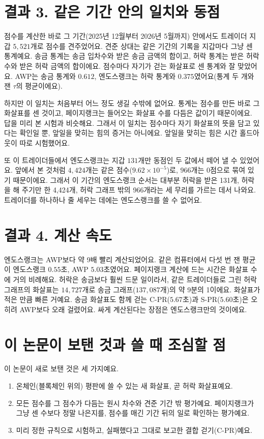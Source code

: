 \section*{결과 3. 같은 기간 안의 일치와 동점}

점수를 계산한 바로 그 기간(2025년 12월부터 2026년 5월까지) 안에서도 트레이더 지갑 $5{,}521$개로 점수를 견주었어요. 견준 상대는 같은 기간의 기록을 지갑마다 그냥 센 통계예요. 송금 통계는 송금 입차수와 받은 송금 금액의 합이고, 허락 통계는 받은 허락 수와 받은 허락 금액의 합이에요. 점수마다 자기가 걷는 화살표로 센 통계와 잘 맞았어요. AWP는 송금 통계와 $0.612$, 엔도스랭크는 허락 통계와 $0.375$였어요(통계 두 개와 잰 $\tau$의 평균이에요).

하지만 이 일치는 처음부터 어느 정도 생길 수밖에 없어요. 통계는 점수를 만든 바로 그 화살표를 센 것이고, 페이지랭크는 들어오는 화살표 수를 다듬은 값이기 때문이에요. 답을 미리 본 시험과 비슷해요. 그래서 이 일치는 점수마다 자기 화살표의 뜻을 담고 있다는 확인일 뿐, 앞일을 맞히는 힘의 증거는 아니에요. 앞일을 맞히는 힘은 시간 홀드아웃이 따로 시험했어요.

또 이 트레이더들에서 엔도스랭크는 지갑 $131$개만 동점인 두 값에서 떼어 낼 수 있었어요. 앞에서 본 것처럼 $4{,}424$개는 같은 점수($9.62\times10^{-5}$)로, $966$개는 0점으로 묶여 있기 때문이에요. 그래서 이 기간의 엔도스랭크 순서는 대부분 허락을 받은 131개, 허락을 해 주기만 한 4,424개, 허락 그래프 밖의 966개라는 세 무리를 가르는 데서 나와요. 트레이더를 하나하나 줄 세우는 데에는 엔도스랭크를 쓸 수 없어요.

\section*{결과 4. 계산 속도}

엔도스랭크는 AWP보다 약 9배 빨리 계산되었어요. 같은 컴퓨터에서 다섯 번 잰 평균이 엔도스랭크 $0.55$초, AWP $5.03$초였어요. 페이지랭크 계산에 드는 시간은 화살표 수에 거의 비례해요. 허락은 송금보다 훨씬 드문 일이라서, 같은 트레이더들로 그린 허락 그래프의 화살표는 $14{,}727$개로 송금 그래프($137{,}087$개)의 약 9분의 1이에요. 화살표가 적은 만큼 빠른 거예요. 송금 화살표도 함께 걷는 C-PR($5.67$초)과 S-PR($5.60$초)은 오히려 AWP보다 오래 걸렸어요. 싸게 계산된다는 장점은 엔도스랭크만의 것이에요.

\section*{이 논문이 보탠 것과 쓸 때 조심할 점}

이 논문이 새로 보탠 것은 세 가지예요.
\begin{enumerate}
\item 온체인(블록체인 위의) 평판에 쓸 수 있는 새 화살표, 곧 허락 화살표예요.
\item 모든 점수를 그 점수가 다듬는 원시 차수와 견준 기간 밖 평가예요. 페이지랭크가 그냥 센 수보다 정말 나은지를, 점수를 매긴 기간 뒤의 일로 확인하는 평가예요.
\item 미리 정한 규칙으로 시험하고, 실패했다고 그대로 보고한 결합 걷기(C-PR)예요.
\end{enumerate}

